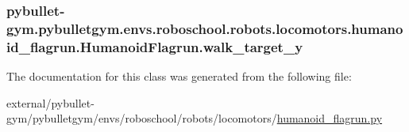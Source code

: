 \subsubsection[{\texorpdfstring{walk\+\_\+target\+\_\+y}{walk_target_y}}]{\setlength{\rightskip}{0pt plus 5cm}pybullet-\/gym.\+pybulletgym.\+envs.\+roboschool.\+robots.\+locomotors.\+humanoid\+\_\+flagrun.\+Humanoid\+Flagrun.\+walk\+\_\+target\+\_\+y}\hypertarget{classpybullet-gym_1_1pybulletgym_1_1envs_1_1roboschool_1_1robots_1_1locomotors_1_1humanoid__flagrun_1_1_humanoid_flagrun_ae4a457ae1721941a9f3d5822d277f17b}{}\label{classpybullet-gym_1_1pybulletgym_1_1envs_1_1roboschool_1_1robots_1_1locomotors_1_1humanoid__flagrun_1_1_humanoid_flagrun_ae4a457ae1721941a9f3d5822d277f17b}


The documentation for this class was generated from the following file\+:\begin{DoxyCompactItemize}
\item 
external/pybullet-\/gym/pybulletgym/envs/roboschool/robots/locomotors/\hyperlink{humanoid__flagrun_8py}{humanoid\+\_\+flagrun.\+py}\end{DoxyCompactItemize}
